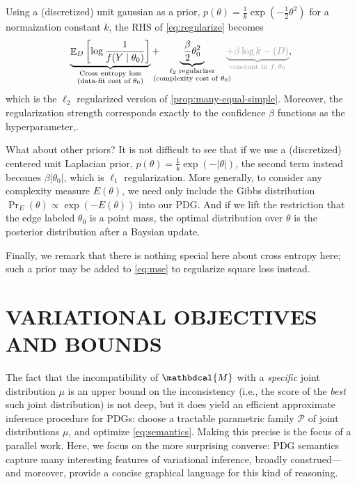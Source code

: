 \documentclass[twoside]{article}
\theoremstyle{plain}
\theoremstyle{definition}
\let\H\relax
\DeclareMathOperator{\H}{\mathrm{H}} %
\DeclareMathOperator*{\Ex}{\mathbb{E}} %
\newcommand{\dg}[1]{\mathbdcal{#1}}
\begin{document}
Using a (discretized) unit gaussian as a prior, $p(\theta) = \frac{1}{k} \exp(-\frac12 \theta^2)$ for a normaization constant $k$, the RHS of \eqref{eq:regularize} becomes
\[ \underbrace{\Ex\nolimits_{D} \left[\log \frac{1}{f(Y \mid \theta_0)} \right]}
	_{\substack{\text{Cross entropy loss}\\(\text{data-fit cost of $\theta_0$})}}%
	+ \!\!\!\!\!\underbrace{~\frac\beta2 \theta_0^2~}_{\substack{\ell_2 \text{ regularizer}\\(\text{complexity cost of $\theta_0$})}} \!\!\!\!
	{\color{gray!80} \underbrace{+ \beta \log k - \H(D)}_{\text{constant in $f, \theta_0$}}}, \]
which is the $\ell_2$ regularized version of \cref{prop:many-equal-simple}.
Moreover, the regularization strength corresponds exactly to the confidence $\beta$ functions as the hyperparameter,.

What about other priors? It is not difficult to see that if we use a (discretized) centered unit Laplacian prior, $p(\theta) = \frac1k \exp(-|\theta|)$, the second term instead becomes $\beta |\theta_0|$, which is $\ell_1$ regularization.
More generally, to consider any complexity measure $E(\theta)$, we need only include the Gibbs distribution $\Pr_E(\theta) \propto \exp(-E(\theta))$ into our PDG.
And if we lift the restriction that the edge labeled $\theta_0$ is a point mass, the optimal distribution over $\theta$ is the posterior distribution after a Baysian update.

Finally, we remark that there is nothing special here about cross entropy here; such a prior may be added to \eqref{eq:mse} to regularize square loss instead.

\section{VARIATIONAL OBJECTIVES AND BOUNDS}
\label{sec:theory}





The fact that the incompatibility of $\dg M$ with a \emph{specific} joint distribution $\mu$ is an upper bound on the inconsistency (i.e., the score of the \emph{best} such joint distribution) is not deep, but it does yield an efficient approximate inference procedure for PDGs: choose a tractable parametric family $\mathcal P$ of joint distributions $\mu$, and optimize \eqref{eq:semantics}. Making this precise is the focus of a parallel work.
Here, we focus on the more surprising converse:  PDG semantics capture many interesting features of variational inference, broadly construed--- and moreover, provide a concise graphical language for this kind of reasoning.
\end{document}
